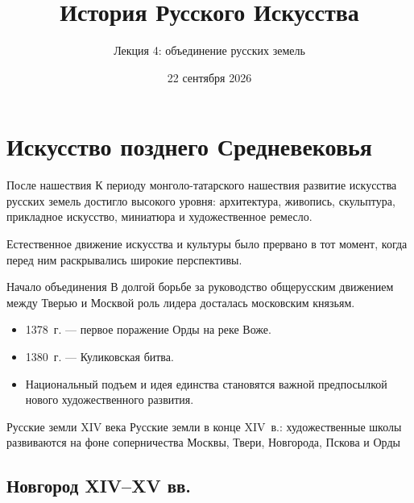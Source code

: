 
{
  \title{История Русского Искусства}
  \subtitle{Лекция 4: объединение русских земель}
  \date{22 сентября 2026}

  \begin{frame}
    \titlepage
  \end{frame}
}

\section{Искусство позднего Средневековья}

\begin{frame}{После нашествия}
  К периоду монголо-татарского нашествия развитие искусства русских земель
  достигло высокого уровня: архитектура, живопись, скульптура,
  прикладное искусство, миниатюра и художественное ремесло.

  \vspace{0.8em}
  Естественное движение искусства и культуры было прервано в тот момент,
  когда перед ним раскрывались широкие перспективы.
\end{frame}

\begin{frame}{Начало объединения}
  В долгой борьбе за руководство общерусским движением между Тверью
  и Москвой роль лидера досталась московским князьям.

  \begin{itemize}
    \item 1378~г. --- первое поражение Орды на реке Воже.
    \item 1380~г. --- Куликовская битва.
    \item Национальный подъем и идея единства становятся важной
          предпосылкой нового художественного развития.
  \end{itemize}
\end{frame}

\begin{frame}{Русские земли XIV века}
    {Русские земли в конце XIV~в.:
     художественные школы развиваются на фоне соперничества Москвы,
     Твери, Новгорода, Пскова и Орды}
\end{frame}

\subsection{Новгород XIV--XV вв.}

